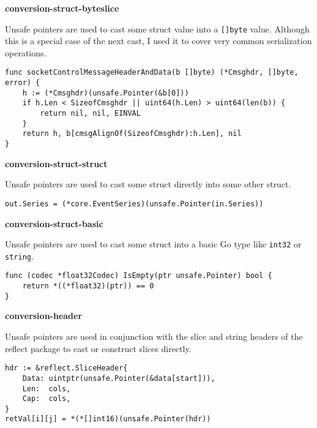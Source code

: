 \textbf{conversion-struct-byteslice}

Unsafe pointers are used to cast some struct value into a \texttt{[]byte} value.
Although this is a special case of the next cast, I used it to cover very common serialization operations.

\begin{lstlisting}[language=Golang, label=lst:survey-small-classexample-conversion-struct-byteslice, caption=Usage class example: conversion-struct-byteslice]
func socketControlMessageHeaderAndData(b []byte) (*Cmsghdr, []byte, error) {
    h := (*Cmsghdr)(unsafe.Pointer(&b[0]))
    if h.Len < SizeofCmsghdr || uint64(h.Len) > uint64(len(b)) {
        return nil, nil, EINVAL
    }
    return h, b[cmsgAlignOf(SizeofCmsghdr):h.Len], nil
}
\end{lstlisting}


\textbf{conversion-struct-struct}

Unsafe pointers are used to cast some struct directly into some other struct.

\begin{lstlisting}[language=Golang, label=lst:survey-small-classexample-conversion-struct-struct, caption=Usage class example: conversion-struct-struct]
out.Series = (*core.EventSeries)(unsafe.Pointer(in.Series))
\end{lstlisting}


\textbf{conversion-struct-basic}

Unsafe pointers are used to cast some struct into a basic Go type like \texttt{int32} or \texttt{string}.

\begin{lstlisting}[language=Golang, label=lst:survey-small-classexample-conversion-struct-basic, caption=Usage class example: conversion-struct-basic]
func (codec *float32Codec) IsEmpty(ptr unsafe.Pointer) bool {
    return *((*float32)(ptr)) == 0
}
\end{lstlisting}


\textbf{conversion-header}

Unsafe pointers are used in conjunction with the slice and string headers of the reflect package to cast or construct
slices directly.

\begin{lstlisting}[language=Golang, label=lst:survey-small-classexample-conversion-header, caption=Usage class example: conversion-header]
hdr := &reflect.SliceHeader{
    Data: uintptr(unsafe.Pointer(&data[start])),
    Len:  cols,
    Cap:  cols,
}
retVal[i][j] = *(*[]int16)(unsafe.Pointer(hdr))
\end{lstlisting}


